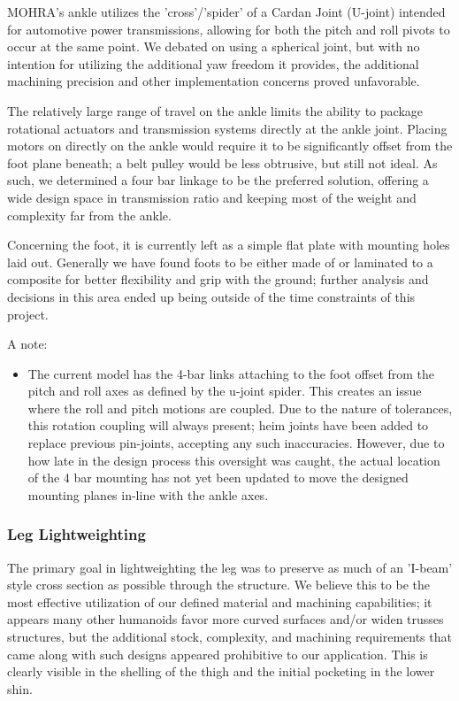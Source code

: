 \documentclass{article}
\begin{document}
MOHRA's ankle utilizes the 'cross'/'spider' of a Cardan Joint (U-joint) intended for automotive power transmissions, allowing for both the pitch and roll pivots to occur at the same point. We debated on using a spherical joint, but with no intention for utilizing the additional yaw freedom it provides, the additional machining precision and other implementation concerns proved unfavorable.

The relatively large range of travel on the ankle limits the ability to package rotational actuators and transmission systems directly at the ankle joint. Placing motors on directly on the ankle would require it to be significantly offset from the foot plane beneath; a belt pulley would be less obtrusive, but still not ideal. As such, we determined a four bar linkage to be the preferred solution, offering a wide design space in transmission ratio and keeping most of the weight and complexity far from the ankle. 

Concerning the foot, it is currently left as a simple flat plate with mounting holes laid out. Generally we have found foots to be either made of or laminated to a composite for better flexibility and grip with the ground; further analysis and decisions in this area ended up being outside of the time constraints of this project.

A note:
\begin{itemize}
    \item The current model has the 4-bar links attaching to the foot offset from the pitch and roll axes as defined by the u-joint spider. This creates an issue where the roll and pitch motions are coupled. Due to the nature of tolerances, this rotation coupling will always present; heim joints have been added to replace previous pin-joints, accepting any such inaccuracies. However, due to how late in the design process this oversight was caught, the actual location of the 4 bar mounting has not yet been updated to move the designed mounting planes in-line with the ankle axes.
\end{itemize}

\subsubsection{Leg Lightweighting}

The primary goal in lightweighting the leg was to preserve as much of an 'I-beam' style cross section as possible through the structure. We believe this to be the most effective utilization of our defined material and machining capabilities; it appears many other humanoids favor more curved surfaces and/or widen trusses structures, but the additional stock, complexity, and machining requirements that came along with such designs appeared prohibitive to our application. This is clearly visible in the shelling of the thigh and the initial pocketing in the lower shin.  
\end{document}
